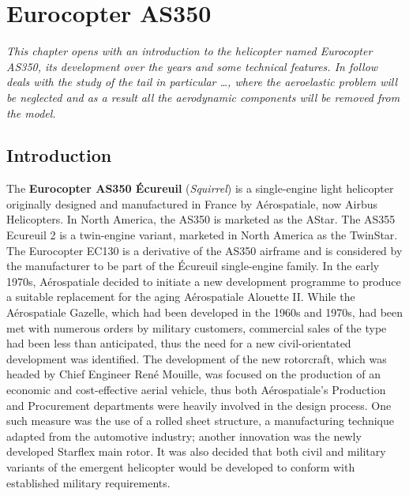 \chapter{Eurocopter AS350}
\label{ch:Eurocopter AS350}

\emph{This chapter opens with an introduction to the helicopter named Eurocopter AS350, its development over the years and some technical features. In follow deals with the study of the tail in particular \dots, where the aeroelastic problem will be neglected and as a result all the aerodynamic components will be removed from the model.}

\section{Introduction}
The \textbf{Eurocopter AS350 Écureuil} (\emph{Squirrel}) is a single-engine light helicopter originally designed and manufactured in France by Aérospatiale, now Airbus Helicopters. In North America, the AS350 is marketed as the AStar. The AS355 Ecureuil 2 is a twin-engine variant, marketed in North America as the TwinStar. The Eurocopter EC130 is a derivative of the AS350 airframe and is considered by the manufacturer to be part of the Écureuil single-engine family.
In the early 1970s, Aérospatiale decided to initiate a new development programme to produce a suitable replacement for the aging Aérospatiale Alouette II.
While the Aérospatiale Gazelle, which had been developed in the 1960s and 1970s, had been met with numerous orders by military customers, commercial sales of the type had been less than anticipated, thus the need for a new civil-orientated development was identified.
The development of the new rotorcraft, which was headed by Chief Engineer René Mouille, was focused on the production of an economic and cost-effective aerial vehicle, thus both Aérospatiale's Production and Procurement departments were heavily involved in the design process.
One such measure was the use of a rolled sheet structure, a manufacturing technique adapted from the automotive industry; another innovation was the newly developed Starflex main rotor. It was also decided that both civil and military variants of the emergent helicopter would be developed to conform with established military requirements\cite{wiki:xxx}.

